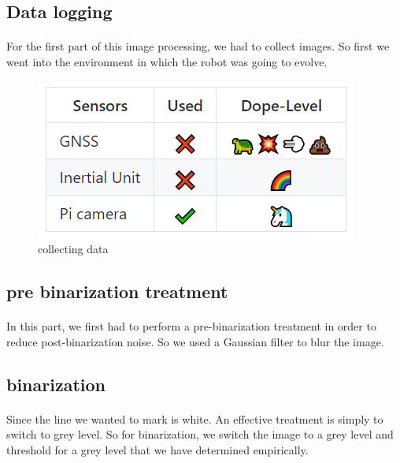 \subsection{Data logging}
\paragraph{}
For the first part of this image processing, we had to collect images.
So first we went into the environment in which the robot was going to evolve.

\begin{figure}[h!]
    \begin{center}
        \includegraphics[scale=0.3]{Images/Sensors.png}
    \end{center}
    \caption{collecting data}
    \label{fig:capture}
\end{figure}

\subsection{pre binarization treatment}
\paragraph{}
In this part, we first had to perform a pre-binarization treatment in order to reduce post-binarization noise.
So we used a Gaussian filter to blur the image.

\subsection{binarization}
\paragraph{}
Since the line we wanted to mark is white. An effective treatment is simply to switch to grey level. 
So for binarization, we switch the image to a grey level and threshold for a grey level that we have determined empirically.

